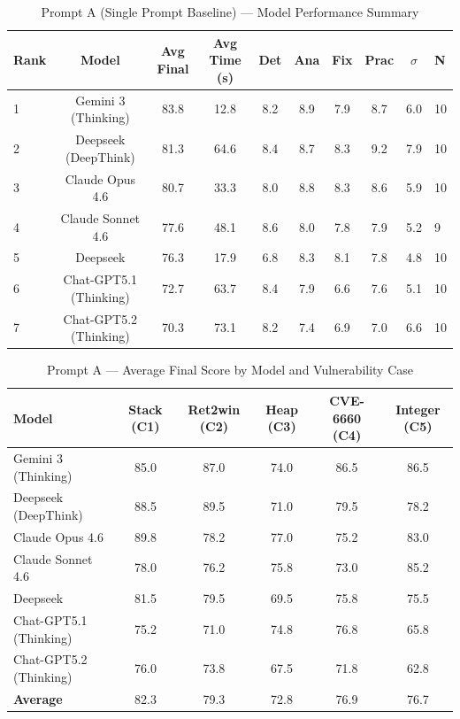 \begin{table}[htbp]
\centering
\caption{Prompt A (Single Prompt Baseline) — Model Performance Summary}
\label{tab:prompt_a_rankings}
\begin{tabular}{lccccccccl}
\toprule
\textbf{Rank} & \textbf{Model} & \textbf{Avg Final} & \textbf{Avg Time (s)} & \textbf{Det} & \textbf{Ana} & \textbf{Fix} & \textbf{Prac} & \textbf{$\sigma$} & \textbf{N} \\
\midrule
1 & Gemini 3 (Thinking) & 83.8 & 12.8 & 8.2 & 8.9 & 7.9 & 8.7 & 6.0 & 10 \\
2 & Deepseek (DeepThink) & 81.3 & 64.6 & 8.4 & 8.7 & 8.3 & 9.2 & 7.9 & 10 \\
3 & Claude Opus 4.6 & 80.7 & 33.3 & 8.0 & 8.8 & 8.3 & 8.6 & 5.9 & 10 \\
4 & Claude Sonnet 4.6 & 77.6 & 48.1 & 8.6 & 8.0 & 7.8 & 7.9 & 5.2 & 9 \\
5 & Deepseek & 76.3 & 17.9 & 6.8 & 8.3 & 8.1 & 7.8 & 4.8 & 10 \\
6 & Chat-GPT5.1 (Thinking) & 72.7 & 63.7 & 8.4 & 7.9 & 6.6 & 7.6 & 5.1 & 10 \\
7 & Chat-GPT5.2 (Thinking) & 70.3 & 73.1 & 8.2 & 7.4 & 6.9 & 7.0 & 6.6 & 10 \\
\bottomrule
\end{tabular}
\end{table}

\begin{table}[htbp]
\centering
\caption{Prompt A — Average Final Score by Model and Vulnerability Case}
\label{tab:prompt_a_per_case}
\begin{tabular}{lccccc}
\toprule
\textbf{Model} & \textbf{Stack (C1)} & \textbf{Ret2win (C2)} & \textbf{Heap (C3)} & \textbf{CVE-6660 (C4)} & \textbf{Integer (C5)} \\
\midrule
Gemini 3 (Thinking) & 85.0 & 87.0 & 74.0 & 86.5 & 86.5 \\
Deepseek (DeepThink) & 88.5 & 89.5 & 71.0 & 79.5 & 78.2 \\
Claude Opus 4.6 & 89.8 & 78.2 & 77.0 & 75.2 & 83.0 \\
Claude Sonnet 4.6 & 78.0 & 76.2 & 75.8 & 73.0 & 85.2 \\
Deepseek & 81.5 & 79.5 & 69.5 & 75.8 & 75.5 \\
Chat-GPT5.1 (Thinking) & 75.2 & 71.0 & 74.8 & 76.8 & 65.8 \\
Chat-GPT5.2 (Thinking) & 76.0 & 73.8 & 67.5 & 71.8 & 62.8 \\
\midrule
\textbf{Average} & 82.3 & 79.3 & 72.8 & 76.9 & 76.7 \\
\bottomrule
\end{tabular}
\end{table}

